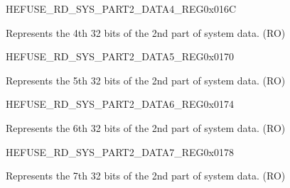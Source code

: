 \begin{register}{H}{EFUSE\_RD\_SYS\_PART2\_DATA4\_REG}{0x016C}\label{regdesc:EFUSERDSYSPART2DATA4REG}
%
\regnewline%
\begin{regdesc}\begin{reglist}
\label{fielddesc:EFUSESYSDATAPART24}\item [EFUSE\_SYS\_DATA\_PART2\_4] Represents the 4th 32 bits of the 2nd part of system data. (RO)
\end{reglist}\end{regdesc}
\end{register}


\begin{register}{H}{EFUSE\_RD\_SYS\_PART2\_DATA5\_REG}{0x0170}\label{regdesc:EFUSERDSYSPART2DATA5REG}
%
\regnewline%
\begin{regdesc}\begin{reglist}
\label{fielddesc:EFUSESYSDATAPART25}\item [EFUSE\_SYS\_DATA\_PART2\_5] Represents the 5th 32 bits of the 2nd part of system data. (RO)
\end{reglist}\end{regdesc}
\end{register}


\begin{register}{H}{EFUSE\_RD\_SYS\_PART2\_DATA6\_REG}{0x0174}\label{regdesc:EFUSERDSYSPART2DATA6REG}
%
\regnewline%
\begin{regdesc}\begin{reglist}
\label{fielddesc:EFUSESYSDATAPART26}\item [EFUSE\_SYS\_DATA\_PART2\_6] Represents the 6th 32 bits of the 2nd part of system data. (RO)
\end{reglist}\end{regdesc}
\end{register}


\begin{register}{H}{EFUSE\_RD\_SYS\_PART2\_DATA7\_REG}{0x0178}\label{regdesc:EFUSERDSYSPART2DATA7REG}
%
\regnewline%
\begin{regdesc}\begin{reglist}
\label{fielddesc:EFUSESYSDATAPART27}\item [EFUSE\_SYS\_DATA\_PART2\_7] Represents the 7th 32 bits of the 2nd part of system data. (RO)
\end{reglist}\end{regdesc}
\end{register}


